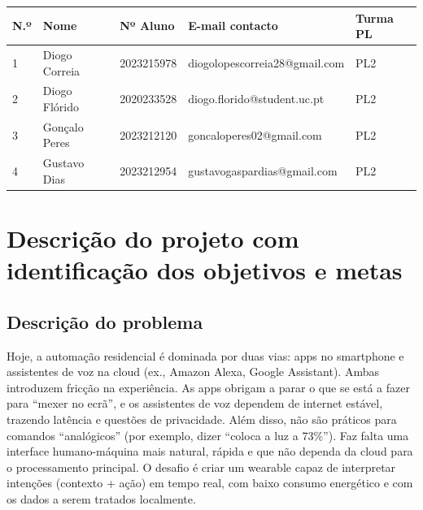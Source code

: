\documentclass[11pt, a4paper]{article}
\begin{document}
\begin{table}[H]
    \small
    \centering
    \begin{tabular}{|p{}|p{}|p{}|p{}|p{}|}
        \hline
        \cellcolor{lightgray}\textbf{N.º} &
        \cellcolor{lightgray}\textbf{Nome} &
        \cellcolor{lightgray}\textbf{Nº Aluno} &
        \cellcolor{lightgray}\textbf{E-mail contacto} &
        \cellcolor{lightgray}\textbf{Turma PL} \\
        \hline
        1 & Diogo Correia & 2023215978 & diogolopescorreia28@gmail.com & PL2 \\
        \hline
        2 & Diogo Flórido & 2020233528 & diogo.florido@student.uc.pt & PL2 \\
        \hline
        3 & Gonçalo Peres & 2023212120 & goncaloperes02@gmail.com & PL2 \\
        \hline
        4 & Gustavo Dias & 2023212954 & gustavogaspardias@gmail.com & PL2 \\
        \hline
    \end{tabular}
\end{table}

\section{Descrição do projeto com identificação dos objetivos e metas}

\subsection{Descrição do problema}
Hoje, a automação residencial é dominada por duas vias: apps no smartphone e assistentes de voz na cloud (ex., Amazon Alexa, Google Assistant). Ambas introduzem fricção na experiência. As apps obrigam a parar o que se está a fazer para ``mexer no ecrã'', e os assistentes de voz dependem de internet estável, trazendo latência e questões de privacidade. Além disso, não são práticos para comandos ``analógicos'' (por exemplo, dizer ``coloca a luz a 73\%''). Faz falta uma interface humano-máquina mais natural, rápida e que não dependa da cloud para o processamento principal. O desafio é criar um wearable capaz de interpretar intenções (contexto + ação) em tempo real, com baixo consumo energético e com os dados a serem tratados localmente.
\end{document}
